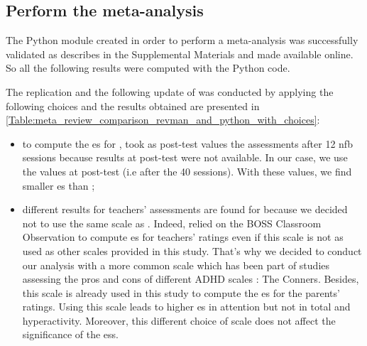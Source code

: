 \subsection{Perform the meta-analysis}

The Python module created in order to perform a meta-analysis was successfully validated as describes in the Supplemental Materials and made available online.
So all the following results were computed with the Python code. 

The replication and the following update of \citeauthor{Cortese2016} was conducted by applying the following choices and the results obtained are presented 
in \cref{Table:meta_review_comparison_revman_and_python_with_choices}:

\begin{itemize}
    \item to compute the \gls{es} for \citet{Arnold2014}, \citet{Cortese2016} took as post-test values the assessments after 12 \gls{nfb} sessions
		because results at post-test were not available. In our case, we use the values at post-test (i.e after the 40 sessions). With these values, 
		we find smaller \gls{es} than \citet{Cortese2016};  
    \item different results for teachers' assessments are found for \cite{Steiner2014} because we decided not to use the same scale 
		as \citeauthor{Cortese2016}. Indeed, \citeauthor{Cortese2016} relied on the BOSS Classroom Observation \citep{Shapiro2010} to compute \gls{es}
		for teachers' ratings even if this scale is not as used as other scales provided in this study. That's why we decided to conduct our analysis
		with a more common scale which has been part of studies assessing the pros and cons of different ADHD scales \citep{Epstein2012, Collett2003}: The Conners. 
		Besides, this scale is already used in this study to compute the \gls{es} for the parents' ratings. 
		Using this scale leads to higher \gls{es} in attention but not in total and hyperactivity. Moreover, this different choice of 
		scale does not affect the significance of the \glspl{es}.
\end{itemize}

\begin{table}[h!]
  \centering
  \caption{Comparison between \citet{Cortese2016} results obtained with RevMan \citep{RevMan} and those obtained with the Python code with our 
	choices applied ($^a$ post-test values for \citeauthor{Arnold2014} are obtained after 40 sessions of \gls{nfb} and Conners scale is used for \citeauthor{Steiner2014}
	teachers' outcomes). \glspl{se} and their corresponding p-value (in parenthesis) are presented. With the Python program, a negative \gls{se}
	is in favor of \gls{nfb} unlike \citeauthor{Cortese2016}.}

  \label{Table:meta_review_comparison_revman_and_python_with_choices}
\end{table}

